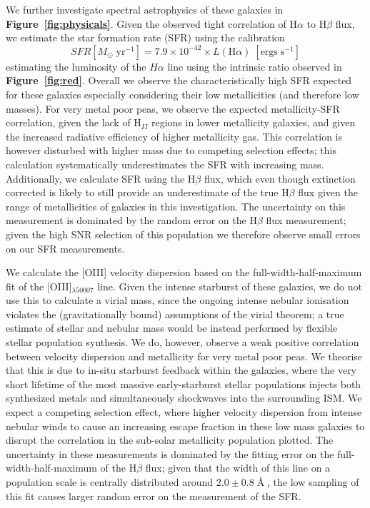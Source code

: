 \documentclass[fleqn,usenatbib]{mnras}
\begin{document}
We further investigate spectral astrophysics of these galaxies in \textbf{Figure~\ref{fig:physicals}}. Given the observed tight correlation of H$\alpha$ to H$\beta$ flux, we estimate the star formation rate (SFR) using the \cite{kennicutt1998, kennicutt2021} calibration 
\begin{equation}
SFR [M_{\odot}\; \mathrm{yr}^{-1}] = 7.9 \times 10^{-42} \times L(\mathrm{H}\alpha)\; [\mathrm{ergs\;s}^{-1}]
\end{equation}
estimating the luminosity of the $H\alpha$ line using the intrinsic ratio observed in \textbf{Figure~\ref{fig:red}}. Overall we observe the characteristically high SFR expected for these galaxies especially considering their low metallicities (and therefore low masses). For very metal poor peas, we observe the expected metallicity-SFR correlation, given the lack of H$_{II}$ regions in lower metallicity galaxies, and given the increased radiative efficiency of higher metallicity gas. This correlation is however disturbed with higher mass due to competing selection effects; this calculation systematically underestimates the SFR with increasing mass. Additionally,  we calculate SFR using the H$\beta$ flux, which even though extinction corrected is likely to still provide an underestimate of the true H$\beta$ flux given the range of metallicities of galaxies in this investigation. The uncertainty on this measurement is dominated by the random error on the H$\beta$ flux measurement; given the high SNR selection of this population we therefore observe small errors on our SFR measurements.

We calculate the [OIII] velocity dispersion based on the full-width-half-maximum fit of the [OIII]$_{\lambda50007}$ line. Given the intense starburst of these galaxies, we do not use this to calculate a virial mass, since the ongoing intense nebular ionisation violates the (gravitationally bound) assumptions of the virial theorem; a true estimate of stellar and nebular mass would be instead performed by flexible stellar population synthesis. We do, however, observe a weak positive correlation between velocity dispersion and metallicity for very metal poor peas. We theorise that this is due to in-situ starburst feedback within the galaxies, where the very short lifetime of the most massive early-starburst stellar populations injects both synthesized metals and simultaneously shockwaves into the surrounding ISM. We expect a competing selection effect, where higher velocity dispersion from intense nebular winds to cause an increasing escape fraction in these low mass galaxies to disrupt the correlation in the sub-solar metallicity population plotted. The uncertainty in these measurements is dominated by the fitting error on the full-width-half-maximum of the H$\beta$ flux; given that the width of this line on a population scale is centrally distributed around $2.0\pm0.8\;$\AA$\;$, the low sampling of this fit causes larger random error on the measurement of the SFR.
\end{document}
